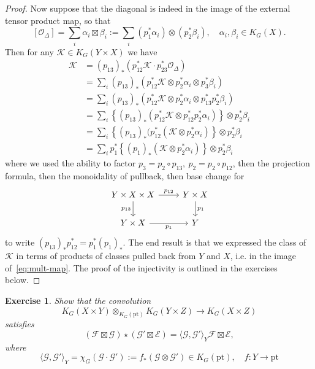 \documentclass[11pt]{amsart}
\newtheorem{exercise}[dummy]{Exercise}
\theoremstyle{definition}
\newcommand{\Oc}{\mathcal{O}}
\numberwithin{equation}{subsection}
\numberwithin{figure}{subsection}
\newcommand{\pt}{\mathrm{pt}}
\begin{document}
\begin{proof}
 Now suppose that the diagonal is indeed in the image of the external tensor product map, so that 
$$
[\Oc_\Delta] = \sum_i \alpha_i\boxtimes \beta_i := \sum_i (p_1^*\alpha_i)\otimes (p_2^*\beta_i),\quad \alpha_i,\beta_i\in K_G(X).
$$
Then for any $\mathcal{K}\in K_G(Y\times X)$ we have
\begin{align*}
\mathcal{K} &= (p_{13})_*\left(p_{12}^*\mathcal{K} \cdot p_{23}^*\Oc_\Delta\right)\\
&=\sum_i (p_{13})_*\left(p_{12}^*\mathcal{K}\otimes p_{2}^*\alpha_i\otimes p_{3}^*\beta_i\right)\\
&=\sum_i (p_{13})_*\left(p_{12}^*\mathcal{K}\otimes p_{2}^*\alpha_i\otimes p_{13}^*p_2^*\beta_i\right)\\
&=\sum_i \left\{(p_{13})_*(p_{12}^*\mathcal{K}\otimes p_{12}^*p_{2}^*\alpha_i)\right\}\otimes p_2^*\beta_i\\
&=\sum_i \left\{(p_{13})_*(p_{12}^*(\mathcal{K}\otimes p_{2}^*\alpha_i)\right\}\otimes p_2^*\beta_i\\
&=\sum_i p_1^*\left\{(p_1)_*(\mathcal{K}\otimes p_{2}^*\alpha_i)\right\}\otimes p_2^*\beta_i
\end{align*}
where we used the ability to factor $p_3 = p_2\circ p_{13}, ~p_2 = p_2\circ p_{12}$, then  the projection formula, then the monoidality of pullback, then base change for
$$
\begin{tikzcd}
Y\times X\times X \arrow{r}{p_{12}} \arrow[swap]{d}{p_{13}}& Y\times X \arrow{d}{p_1} \\
Y\times X \arrow[swap]{r}{p_{1}} & Y
\end{tikzcd}
$$
to write $(p_{13})_*p_{12}^* =p_1^*(p_1)_*$. The end result is that we expressed the class of $\mathcal{K}$ in terms of products of classes pulled back from $Y$ and $X$, i.e. in the image of~\eqref{eq:mult-map}. The proof of the injectivity is outlined in the exercises below.
\end{proof}

\begin{exercise}
\label{eq:conv-formula}
Show that the convolution
$$
K_G(X\times Y)\otimes_{K_G(\pt)} K_G(Y\times Z)\rightarrow K_G(X\times Z)
$$
satisfies
$$
(\mathcal{F}\boxtimes\mathcal{G})\star(\mathcal{G}'\boxtimes\mathcal{E}) = \langle \mathcal{G},\mathcal{G}'\rangle_Y \mathcal{F}\boxtimes \mathcal{E},
$$
where 
$$
\langle\mathcal{G},\mathcal{G}'\rangle_Y =  \chi_G(\mathcal{G}\cdot\mathcal{G}') := f_*(\mathcal{G}\otimes\mathcal{G}')\in K_G(\pt),\quad f:Y\rightarrow \pt
$$
\end{exercise}
\end{document}
